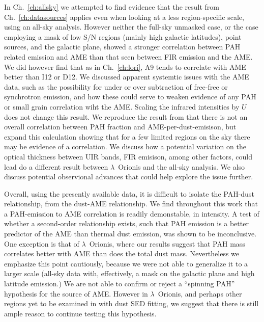   In Ch.~\ref{ch:allsky} we attempted to find evidence that the result from Ch.~\ref{ch:datasources} applies even when looking at a less region-specific scale, using an all-sky analysis. However neither the full-sky unmasked case, or the case employing a mask of low S/N regions (mainly high galactic latitudes), point sources, and the galactic plane, showed a stronger correlation between PAH related emission and AME than that seen between FIR emission and the AME. We did however find that as in Ch.~\ref{ch:lori}, A9 tends to correlate with AME better than I12 or D12. We discussed apparent systemtic issues with the AME data, such as the possibility for under or over subtraction of free-free or synchrotron emission, and how these could serve to weaken evidence of any PAH or small grain correlation wiht the AME. Scaling the infrared intensities by $U$ does not change this result. We reproduce the result from \cite{hensley16} that there is not an overall correlation between PAH fraction and AME-per-dust-emisison, but expand this calculation showing that for a few limited regions on the sky there may be evidence of a correlation. We discuss how a potential variation on the optical thickness between UIR bands, FIR emisison, among other factors, could lead do a different result between $\lambda$~Orionis and the all-sky analysis. We also discuss potential observional advances that could help explore the issue further.

  Overall, using the presently available data, it is difficult to isolate the PAH-dust relationship, from the dust-AME relationship. We find throughout this work that a PAH-emission to AME correlation is readily demonstable, in intensity. A test of whether a second-order relationship exists, such that PAH emission is a better predictor of the AME than thermal dust emission, was shown to be inconclusive. One exception is that of $\lambda$~Orionis, where our results suggest that PAH mass correlates better with AME than does the total dust mass. Nevertheless we emphasize this point cautiously, because we were not able to generalize it to a larger scale (all-sky data with, effectively, a mask on the galactic plane and high latitude emission.)  We are not able to confirm or reject a ``spinning PAH'' hypothesis for the source of AME. However in $\lambda$~Orionis, and perhaps other regions yet to be examined in with dust SED fitting, we suggest that there is still ample reason to continue testing this hypothesis.

